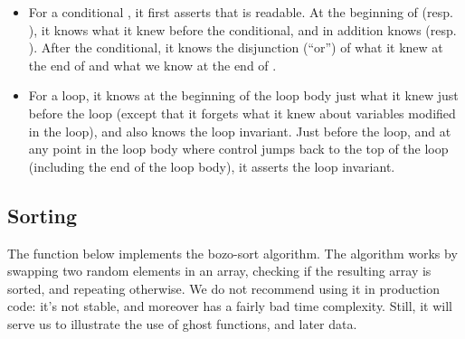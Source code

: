 {{\begin{itemize}
{  the caller.}
\item
For a conditional , it first asserts that
 is readable. At the beginning of  (resp. ), it
knows what it knew before the conditional, and in addition knows
 (resp. ). After the conditional, it knows the 
disjunction (``or'') of what it knew at the end of  and what
we know at the end of .
\item
For a loop, it knows at the beginning of the loop body just what it
knew just before the loop (except that it forgets what it knew about
variables modified in the loop), and also knows the loop
invariant. Just before the loop, and at any point in the loop body where
control jumps back to the top of the loop (including the end of the
loop body), it asserts the loop invariant.
\end{itemize}


\subsection{Sorting}
\label{sect:sorting}

%

The function below implements the bozo-sort algorithm.
The algorithm works by swapping two random elements in an array, checking if the resulting array
is sorted, and repeating otherwise.
We do not recommend using it in production code:
it's not stable, and moreover has a fairly bad time complexity.
Still, it will serve us to illustrate the use of ghost functions, and later data.


}}
